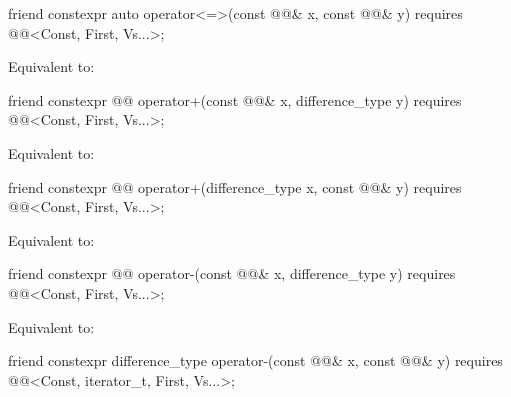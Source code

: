 %
\begin{itemdecl}
friend constexpr auto operator<=>(const @@& x, const @@& y)
  requires @@<Const, First, Vs...>;
\end{itemdecl}

\begin{itemdescr}
\pnum
\effects
Equivalent to: 
\end{itemdescr}

%
\begin{itemdecl}
friend constexpr @@ operator+(const @@& x, difference_type y)
  requires @@<Const, First, Vs...>;
\end{itemdecl}

\begin{itemdescr}
\pnum
\effects
Equivalent to: 
\end{itemdescr}

%
\begin{itemdecl}
friend constexpr @@ operator+(difference_type x, const @@& y)
  requires @@<Const, First, Vs...>;
\end{itemdecl}

\begin{itemdescr}
\pnum
\effects
Equivalent to: 
\end{itemdescr}

%
\begin{itemdecl}
friend constexpr @@ operator-(const @@& x, difference_type y)
  requires @@<Const, First, Vs...>;
\end{itemdecl}

\begin{itemdescr}
\pnum
\effects
Equivalent to: 
\end{itemdescr}

%
\begin{itemdecl}
friend constexpr difference_type operator-(const @@& x, const @@& y)
  requires @@<Const, iterator_t, First, Vs...>;
\end{itemdecl}

